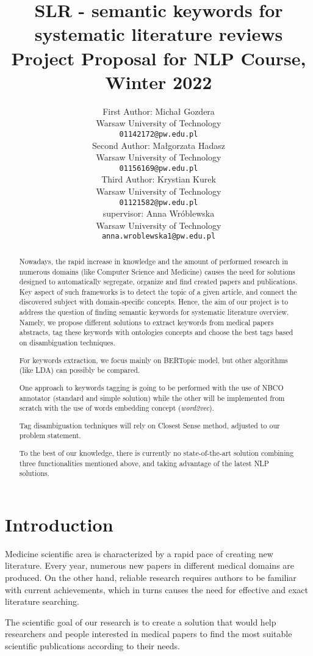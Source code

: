 \documentclass[11pt]{article}
\title{SLR - semantic keywords for systematic literature reviews\\Project Proposal for NLP Course, Winter 2022}
\author{First Author: Michał Gozdera \\
  Warsaw University of Technology \\
  {\tt 01142172@pw.edu.pl} \\\And 
  Second Author: Małgorzata Hadasz \\
  Warsaw University of Technology \\
  {\tt 01156169@pw.edu.pl} \\\AND 
  Third Author: Krystian Kurek \\
  Warsaw University of Technology \\
  {\tt 01121582@pw.edu.pl} \\\And
  supervisor: Anna Wróblewska\\
  Warsaw University of Technology \\
  {\tt anna.wroblewska1@pw.edu.pl}}
\date{}
\begin{document}
\maketitle
\begin{abstract}
Nowadays, the
rapid increase in knowledge and the amount of performed research in numerous domains (like Computer Science and Medicine) causes the need for solutions designed to automatically segregate, organize and find created papers and publications. Key aspect of such frameworks is to detect the topic of a given article, and connect the discovered subject with domain-specific concepts. Hence, the aim of our project is to address the question of finding semantic keywords for systematic literature overview. Namely, we propose different solutions to extract keywords from medical papers abstracts, tag these keywords with ontologies concepts and choose the best tags based on disambiguation techniques.

For keywords extraction, we focus mainly on BERTopic model, but other algorithms (like LDA) can possibly be compared.

One approach to keywords tagging is going to be performed with the use of NBCO annotator (standard and simple solution) while the other will be implemented from scratch with the use of words embedding concept (\textit{word2vec}).  

Tag disambiguation techniques will rely on Closest Sense method, adjusted to our problem statement. 

To the best of our knowledge, there is currently no state-of-the-art solution combining three functionalities mentioned above, and taking advantage of the latest NLP solutions. 


\end{abstract}

\section{Introduction}




Medicine scientific area is characterized by a rapid pace of creating new literature. Every year, numerous new papers in different medical domains are produced. On the other hand, reliable research requires authors to be familiar with current achievements, which in turns causes the need for effective and exact literature searching. 

The scientific goal of our research is to create a solution that would help researchers and people interested in medical papers to find the most suitable scientific publications according to their needs. 
\end{document}
